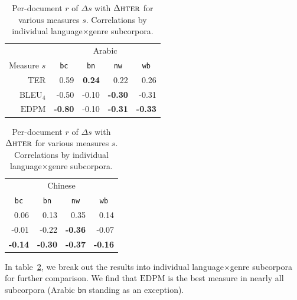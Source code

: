 \documentclass[11pt]{article}
\newcommand{\myEDPM}[0]{\ensuremath{\mathrm{EDPM}}}
\begin{document}
\begin{table}
  \centering
  \begin{tabular}{r|rrrr|}
    & \multicolumn{4}{c|}{Arabic} \\
    \multicolumn{1}{c|}{Measure $s$} & \multicolumn{1}{c}{\texttt{bc}} &
    \multicolumn{1}{c}{\texttt{bn}} & \multicolumn{1}{c}{\texttt{nw}} & \multicolumn{1}{c|}{\texttt{wb}}\\
    \hline{}
    TER      &  0.59  & 
                 \textbf{0.24} &  0.22  &  0.26 \\
    BLEU$_4$ & -0.50  & -0.10  &
                         \textbf{-0.30} & -0.31 \\
    \myEDPM  &
       \textbf{-0.80 }& -0.10 &
                         \textbf{-0.31} &
                                  \textbf{-0.33} \\
  \end{tabular}
  \begin{tabular}{|rrrr|}
    \multicolumn{4}{|c|}{Chinese} \\
        \multicolumn{1}{|c}{\texttt{bc}} &
    \multicolumn{1}{c}{\texttt{bn}} & \multicolumn{1}{c}{\texttt{nw}} & \multicolumn{1}{c|}{\texttt{wb}}\\
    \hline{}
     0.06     &  0.13 &  0.35 &  0.14 \\
    -0.01     & -0.22 &
                \textbf{-0.36}& -0.07 \\
\textbf{-0.14}&
        \textbf{-0.30}&
                \textbf{-0.37}&
                        \textbf{-0.16}\\
  \end{tabular}
  \caption{Per-document $r$ of $\Delta s$ with $\Delta\textsc{hter}$ for various
    measures $s$. Correlations by individual 
    language$\times$genre subcorpora.
  }
  \label{tab:hter:perdoc2}
\end{table}
In table~\ref{tab:hter:perdoc2}, we break out the results into
individual language$\times$genre subcorpora for further comparison. We
find that \myEDPM{} is the best measure in nearly all subcorpora
(Arabic \texttt{bn} standing as an exception).
\end{document}
